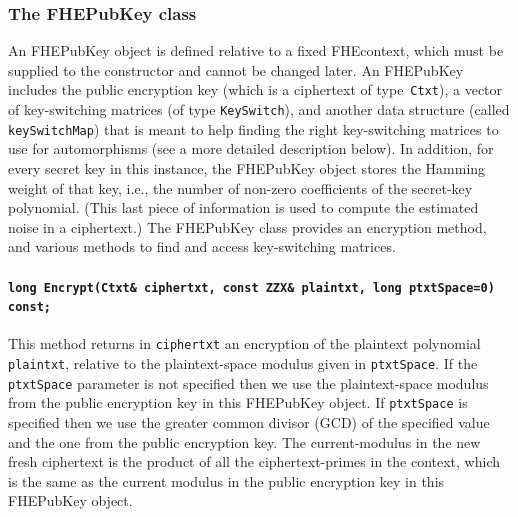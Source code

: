 \documentclass[14pt]{extarticle}
\def\FHEPubKey{\textsf{FHEPubKey}}
\def\FHEcontext{\textsf{FHEcontext}}
\begin{document}
\subsubsection{The {\FHEPubKey} class}\label{sec:FHEPubKey}
An {\FHEPubKey} object is defined relative to a fixed {\FHEcontext},
which must be supplied to the constructor and cannot be changed later.
An {\FHEPubKey} includes the public encryption key (which is a
ciphertext of type~\texttt{Ctxt}), a vector of key-switching
matrices (of type \texttt{KeySwitch}), and another data structure
(called \texttt{keySwitchMap}) that is meant to help finding the right
key-switching matrices to use for automorphisms (see a more detailed
description below). In addition, for every secret key in this
instance, the {\FHEPubKey} object stores the Hamming weight of that
key, i.e., the number of non-zero coefficients of the secret-key
polynomial. (This last piece of information is used to compute the
estimated noise in a ciphertext.) The {\FHEPubKey} class provides an
encryption method, and various methods to find and access key-switching
matrices.

\paragraph{\texttt{long Encrypt(Ctxt\& ciphertxt, const ZZX\& plaintxt, long ptxtSpace=0) const;}}
\label{sec:encryption}
This method returns in \texttt{ciphertxt} an encryption of the
plaintext polynomial \texttt{plaintxt}, relative to the
plaintext-space modulus given in \texttt{ptxtSpace}. If the
\texttt{ptxtSpace} parameter is not specified then we use the
plaintext-space modulus from the public encryption key in this
{\FHEPubKey} object. If \texttt{ptxtSpace} is specified then we
use the greater common divisor (GCD) of the specified value and
the one from the public encryption key.
The current-modulus in the new fresh ciphertext is the product of
all the ciphertext-primes in the context, which is the same as the
current modulus in the public encryption key in this {\FHEPubKey}
object.
\end{document}
